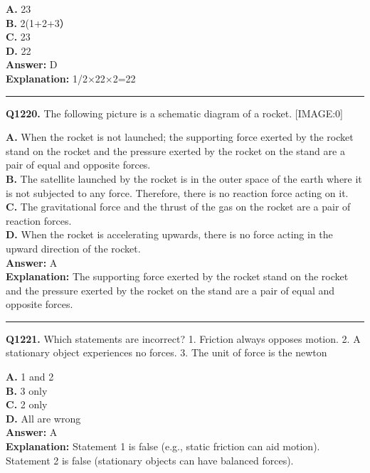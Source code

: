 \documentclass[12pt]{article}
\begin{document}
\textbf{A.} 2\sqrt{}3 \\
\textbf{B.} 2(1+\sqrt{}2+\sqrt{}3） \\
\textbf{C.} 2\sqrt{}3 \\
\textbf{D.} 2\sqrt{}2 \\

\textbf{Answer:} D \\
\textbf{Explanation:} 1/2×2\sqrt{}2×2=2\sqrt{}2

\hrule
\vspace{1em}


\noindent
\textbf{Q1220.} The following picture is a schematic diagram of a rocket.
[IMAGE:0]



\textbf{A.} When
the rocket is not launched; the supporting force exerted by the rocket stand on the rocket and the pressure exerted by the rocket on the stand are a pair of equal and opposite forces. \\
\textbf{B.} The satellite launched by the rocket is in the outer space of the earth where it is not subjected to any force. Therefore, there is no reaction force acting on it. \\
\textbf{C.} The
gravitational force and the thrust of the gas on the rocket are a pair of reaction forces. \\
\textbf{D.} When the rocket is accelerating upwards, there is no force acting in the upward direction of the rocket. \\

\textbf{Answer:} A \\
\textbf{Explanation:} The supporting force exerted by the rocket stand on the rocket and the pressure exerted by the rocket on the stand are a pair of equal and opposite forces.

\hrule
\vspace{1em}


\noindent
\textbf{Q1221.} Which statements are incorrect?
1.
Friction always opposes motion.
2.
A stationary object experiences no forces.
3.
The unit of force is the newton



\textbf{A.} 1 and 2 \\
\textbf{B.} 3 only \\
\textbf{C.} 2 only \\
\textbf{D.} All are wrong \\

\textbf{Answer:} A \\
\textbf{Explanation:} Statement 1 is false (e.g., static friction can aid motion). Statement 2 is false (stationary objects can have balanced forces).
\end{document}
